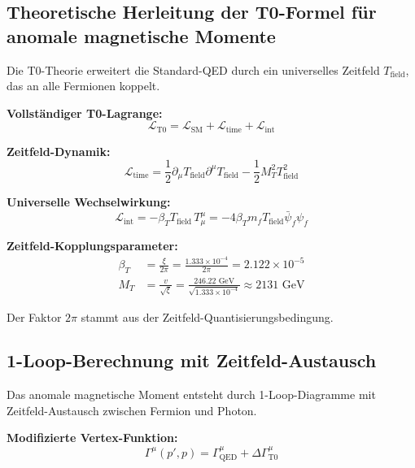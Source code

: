 \documentclass[12pt,a4paper]{article}
\theoremstyle{definition}
\begin{document}
	\subsection{Theoretische Herleitung der T0-Formel für anomale magnetische Momente}
	
	Die T0-Theorie erweitert die Standard-QED durch ein universelles Zeitfeld $T_{\text{field}}$, das an alle Fermionen koppelt.
	
	\textbf{Vollständiger T0-Lagrange:}
	\begin{equation}
		\mathcal{L}_{\text{T0}} = \mathcal{L}_{\text{SM}} + \mathcal{L}_{\text{time}} + \mathcal{L}_{\text{int}}
	\end{equation}
	
	\textbf{Zeitfeld-Dynamik:}
	\begin{equation}
		\mathcal{L}_{\text{time}} = \frac{1}{2}\partial_\mu T_{\text{field}} \partial^\mu T_{\text{field}} - \frac{1}{2}M_T^2 T_{\text{field}}^2
	\end{equation}
	
	\textbf{Universelle Wechselwirkung:}
	\begin{equation}
		\mathcal{L}_{\text{int}} = -\beta_T T_{\text{field}} \, T^\mu_\mu = -4\beta_T m_f T_{\text{field}} \bar{\psi}_f \psi_f
	\end{equation}
	

		\textbf{Zeitfeld-Kopplungsparameter:}
		\begin{align}
			\beta_T &= \frac{\xi}{2\pi} = \frac{1.333 \times 10^{-4}}{2\pi} = 2.122 \times 10^{-5}\\
			M_T &= \frac{v}{\sqrt{\xi}} = \frac{246.22 \text{ GeV}}{\sqrt{1.333 \times 10^{-4}}} \approx 2131 \text{ GeV}
		\end{align}
		
		Der Faktor $2\pi$ stammt aus der Zeitfeld-Quantisierungsbedingung.

	
	\subsection{1-Loop-Berechnung mit Zeitfeld-Austausch}
	
	Das anomale magnetische Moment entsteht durch 1-Loop-Diagramme mit Zeitfeld-Austausch zwischen Fermion und Photon.
	
	\textbf{Modifizierte Vertex-Funktion:}
	\begin{equation}
		\Gamma^\mu(p',p) = \Gamma^\mu_{\text{QED}} + \Delta\Gamma^\mu_{\text{T0}}
	\end{equation}
	
\end{document}
